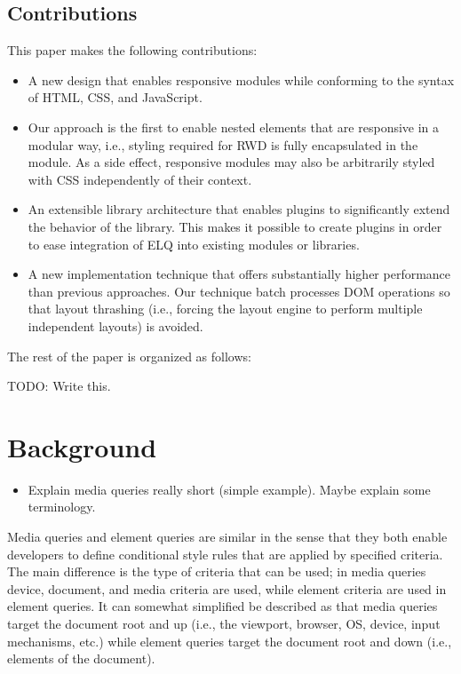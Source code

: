 \documentclass{acm_proc_article-sp}
\newcommand{\elq}{ELQ}
\begin{document}
    \subsection{Contributions}
      This paper makes the following contributions:
      \begin{itemize}
        \item A new design that enables responsive modules while conforming to the syntax of HTML, CSS, and JavaScript.
        \item
          Our approach is the first to enable nested elements that are responsive in a modular way, i.e., styling required for RWD is fully encapsulated in the module.
          As a side effect, responsive modules may also be arbitrarily styled with CSS independently of their context.
        \item
          An extensible library architecture that enables plugins to significantly extend the behavior of the library.
          This makes it possible to create plugins in order to ease integration of \elq{} into existing modules or libraries.
        \item
          A new implementation technique that offers substantially higher performance than previous approaches.
          Our technique batch processes DOM operations so that layout thrashing (i.e., forcing the layout engine to perform multiple independent layouts) is avoided.
      \end{itemize}

    The rest of the paper is organized as follows:

    TODO: Write this.


\section{Background}
  \begin{itemize}
    \item Explain media queries really short (simple example). Maybe explain some terminology.
  \end{itemize}

  Media queries and element queries are similar in the sense that they both enable developers to define conditional style rules that are applied by specified criteria.
  The main difference is the type of criteria that can be used; in media queries device, document, and media criteria are used, while element criteria are used in element queries.
  It can somewhat simplified be described as that media queries target the document root and up (i.e., the viewport, browser, OS, device, input mechanisms, etc.) while element queries target the document root and down (i.e., elements of the document).
\end{document}
